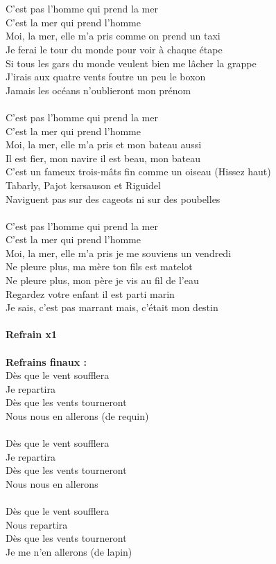 \\\\C'est pas l'homme qui prend la mer
\\C'est la mer qui prend l'homme
\\Moi, la mer, elle m'a pris comme on prend un taxi
\\Je ferai le tour du monde pour voir à chaque étape
\\Si tous les gars du monde veulent bien me lâcher la grappe
\\J'irais aux quatre vents foutre un peu le boxon
\\Jamais les océans n'oublieront mon prénom
\\\\C'est pas l'homme qui prend la mer
\\C'est la mer qui prend l'homme
\\Moi, la mer, elle m'a pris et mon bateau aussi
\\Il est fier, mon navire il est beau, mon bateau
\\C'est un fameux trois-mâts fin comme un oiseau (Hissez haut)
\\Tabarly, Pajot kersauson et Riguidel
\\Naviguent pas sur des cageots ni sur des poubelles
\\\\C'est pas l'homme qui prend la mer
\\C'est la mer qui prend l'homme
\\Moi, la mer, elle m'a pris je me souviens un vendredi
\\Ne pleure plus, ma mère ton fils est matelot
\\Ne pleure plus, mon père je vis au fil de l'eau
\\Regardez votre enfant il est parti marin
\\Je sais, c'est pas marrant mais, c'était mon destin
\\\\\textbf{Refrain x1}
\\\\\textbf{Refrains finaux :}
\\Dès que le vent soufflera
\\Je repartira
\\Dès que les vents tourneront
\\Nous nous en allerons (de requin)
\\\\Dès que le vent soufflera
\\Je repartira
\\Dès que les vents tourneront
\\Nous nous en allerons
\\\\Dès que le vent soufflera
\\Nous repartira
\\Dès que les vents tourneront
\\Je me n'en allerons (de lapin)


\breakpage